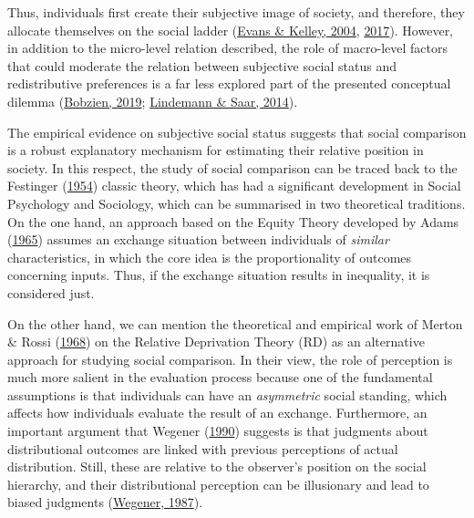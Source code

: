 \documentclass[
  12pt,
]{book}
\begin{document}
Thus, individuals first create their subjective image of society, and therefore, they allocate themselves on the social ladder (\protect\hyperlink{ref-Evans2004}{Evans \& Kelley, 2004}, \protect\hyperlink{ref-Evans2017}{2017}). However, in addition to the micro-level relation described, the role of macro-level factors that could moderate the relation between subjective social status and redistributive preferences is a far less explored part of the presented conceptual dilemma (\protect\hyperlink{ref-Bobzien2019}{Bobzien, 2019}; \protect\hyperlink{ref-Lindemann2014}{Lindemann \& Saar, 2014}).

The empirical evidence on subjective social status suggests that social comparison is a robust explanatory mechanism for estimating their relative position in society. In this respect, the study of social comparison can be traced back to the Festinger (\protect\hyperlink{ref-festinger1954theory}{1954}) classic theory, which has had a significant development in Social Psychology and Sociology, which can be summarised in two theoretical traditions. On the one hand, an approach based on the Equity Theory developed by Adams (\protect\hyperlink{ref-Adams1965}{1965}) assumes an exchange situation between individuals of \emph{similar} characteristics, in which the core idea is the proportionality of outcomes concerning inputs. Thus, if the exchange situation results in inequality, it is considered just.

On the other hand, we can mention the theoretical and empirical work of Merton \& Rossi (\protect\hyperlink{ref-Merton1968}{1968}) on the Relative Deprivation Theory (RD) as an alternative approach for studying social comparison. In their view, the role of perception is much more salient in the evaluation process because one of the fundamental assumptions is that individuals can have an \emph{asymmetric} social standing, which affects how individuals evaluate the result of an exchange. Furthermore, an important argument that Wegener (\protect\hyperlink{ref-Wegener1990}{1990}) suggests is that judgments about distributional outcomes are linked with previous perceptions of actual distribution. Still, these are relative to the observer's position on the social hierarchy, and their distributional perception can be illusionary and lead to biased judgments (\protect\hyperlink{ref-Wegener1987}{Wegener, 1987}).
\end{document}
